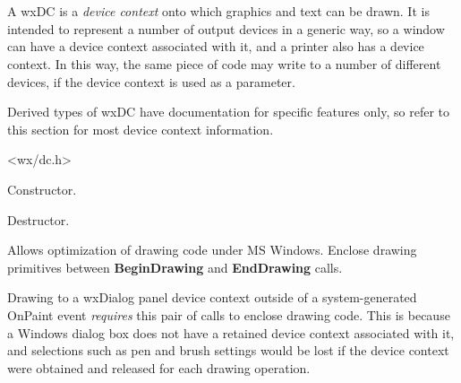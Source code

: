 \section{}\label{wxdc}

A wxDC is a {\it device context} onto which graphics and text can be drawn.
It is intended to represent a number of output devices in a generic way,
so a window can have a device context associated with it, and a printer also has a device context.
In this way, the same piece of code may write to a number of different devices,
if the device context is used as a parameter.

Derived types of wxDC have documentation for specific features
only, so refer to this section for most device context information.




<wx/dc.h>






Constructor.



Destructor.

\label{wxdcbegindrawing}


Allows optimization of drawing code under MS Windows. Enclose
drawing primitives between {\bf BeginDrawing} and {\bf EndDrawing}\rtfsp
calls.

Drawing to a wxDialog panel device context outside of a
system-generated OnPaint event {\it requires} this pair of calls to
enclose drawing code. This is because a Windows dialog box does not have
a retained device context associated with it, and selections such as pen
and brush settings would be lost if the device context were obtained and
released for each drawing operation.

\label{wxdcblit}


